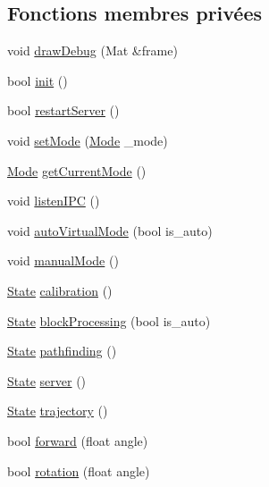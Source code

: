 \subsection*{Fonctions membres privées}
\begin{DoxyCompactItemize}
\item 
void \hyperlink{class_core_ae03caf8d8abe9d4c3b875c6f6a5d40dd}{draw\-Debug} (Mat \&frame)
\item 
bool \hyperlink{class_core_a2ad48b714f575d3f3c25c80ffa72afad}{init} ()
\item 
bool \hyperlink{class_core_a2197457d525b6f0eface1f8712fd2084}{restart\-Server} ()
\item 
void \hyperlink{class_core_a1dac5f63296f11309c2f25770b30912b}{set\-Mode} (\hyperlink{core_8h_a46c8a310cf4c094f8c80e1cb8dc1f911}{Mode} \-\_\-mode)
\item 
\hyperlink{core_8h_a46c8a310cf4c094f8c80e1cb8dc1f911}{Mode} \hyperlink{class_core_a0d0ccf9b40761ed8f88fe1d9a348fc02}{get\-Current\-Mode} ()
\item 
void \hyperlink{class_core_a9677503611528b6d6f2039eff6f80912}{listen\-I\-P\-C} ()
\item 
void \hyperlink{class_core_a7fab8414125602f9f595143bb21d24c1}{auto\-Virtual\-Mode} (bool is\-\_\-auto)
\item 
void \hyperlink{class_core_afcdd1611a6528fd3d597d719405493b4}{manual\-Mode} ()
\item 
\hyperlink{core_8h_a5d74787dedbc4e11c1ab15bf487e61f8}{State} \hyperlink{class_core_a2d832a5e544b5e76d03a7fd596522b42}{calibration} ()
\item 
\hyperlink{core_8h_a5d74787dedbc4e11c1ab15bf487e61f8}{State} \hyperlink{class_core_a8648fac82f0324cead88c8fa2731b286}{block\-Processing} (bool is\-\_\-auto)
\item 
\hyperlink{core_8h_a5d74787dedbc4e11c1ab15bf487e61f8}{State} \hyperlink{class_core_a333060e38c961d6fbf4ba4d01a84e48b}{pathfinding} ()
\item 
\hyperlink{core_8h_a5d74787dedbc4e11c1ab15bf487e61f8}{State} \hyperlink{class_core_a2a8efb95fadd86481ba62c98b72c7f1c}{server} ()
\item 
\hyperlink{core_8h_a5d74787dedbc4e11c1ab15bf487e61f8}{State} \hyperlink{class_core_a185801ec33fe24b0f36e4d9e474403ca}{trajectory} ()
\item 
bool \hyperlink{class_core_a180fe625431721a94959a694fe91ef3f}{forward} (float angle)
\item 
bool \hyperlink{class_core_a0639e803afd1447272759b6b0fa22f60}{rotation} (float angle)
\end{DoxyCompactItemize}
